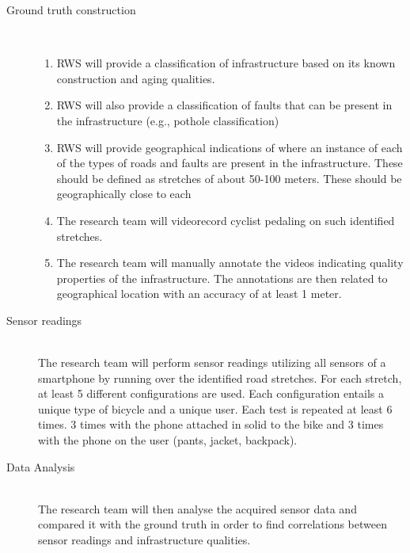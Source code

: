 \documentclass[preprint,12pt]{elsarticle}
\theoremstyle{definition}
\begin{document}
\begin{description}
\item[Ground truth construction]\mbox{}\\[-2ex]
\noindent
  \begin{enumerate}
  \item RWS will provide a classification of
    infrastructure based on its known construction and aging
    qualities. 
  \item RWS will also provide a classification of faults that can be
    present in the infrastructure (e.g., pothole classification)
  \item RWS will provide geographical indications of where an instance
    of each of the types of roads and faults are present in the
    infrastructure. These should be defined as stretches of about
    50-100 meters. These should be geographically close to each 
    \item The research team will videorecord cyclist pedaling on such
      identified stretches.
    \item The research team will manually annotate the videos
      indicating quality properties of the infrastructure. The
      annotations are then related to geographical location with an
      accuracy of at least 1 meter.
\end{enumerate}

\item[Sensor readings]\mbox{}\\
      The research team will perform sensor readings utilizing all
      sensors of a smartphone by running over the identified road
      stretches. For each stretch, at least 5 different configurations
      are used. Each configuration entails a unique type of bicycle
      and a unique user. Each test is repeated at least 6 times. 3
      times with the phone attached in solid to the bike and 3
      times with the phone on the user (pants, jacket, backpack).

\item[Data Analysis]\mbox{}\\
      The research team will then analyse the acquired sensor data and
      compared it with the ground truth in order to find correlations
      between sensor readings and infrastructure qualities. 
\end{description} 
\end{document}
